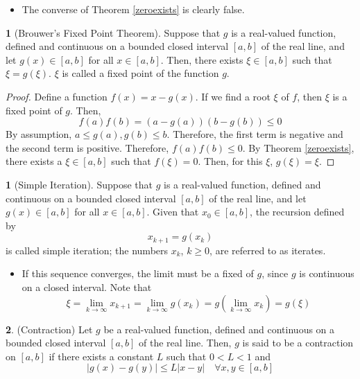 \documentclass[12pt]{article}
\theoremstyle{definition}
\newtheorem{definition}{\color{NavyBlue}{\textbf{Definition}}}
\newtheorem{theorem}{\color{ForestGreen}{\textbf{Theorem}}}
\theoremstyle{definition}
\begin{document}
\begin{itemize}
\item The converse of Theorem \ref{zeroexists} is clearly false.
\end{itemize}

\begin{theorem}[Brouwer's Fixed Point Theorem]
Suppose that $g$ is a real-valued function, defined and continuous on a bounded closed interval $[a,b]$ of the real line, and let $g(x) \in [a,b]$ for all $x \in [a,b]$. Then, there exists $\xi \in [a,b]$ such that $\xi = g(\xi)$. $\xi$ is called a fixed point of the function $g$. 
\end{theorem}
\begin{proof}
Define a function $f(x) = x - g(x)$. If we find a root $\xi$ of $f$, then $\xi$ is a fixed point of $g$. Then,
\begin{equation}
f(a)f(b) = (a - g(a))(b-g(b)) \leq 0
\end{equation}
By assumption, $a \leq g(a), g(b) \leq b$. Therefore, the first term is negative and the second term is positive. Therefore, $f(a)f(b) \leq 0$. By Theorem \ref{zeroexists}, there exists a $\xi \in [a,b]$ such that $f(\xi)=0$. Then, for this $\xi$, $g(\xi) = \xi$.
\end{proof}

\begin{definition}[Simple Iteration]
Suppose that $g$ is a real-valued function, defined and continuous on a bounded closed interval $[a,b]$ of the real line, and let $g(x) \in [a,b]$ for all $x \in [a,b]$. Given that $x_0 \in [a,b]$, the recursion defined by 
\begin{equation}
x_{k+1} = g(x_k)
\end{equation}
is called simple iteration; the numbers $x_k$, $k \geq 0$, are referred to as iterates.
\end{definition}

\begin{itemize}
\item If this sequence converges, the limit must be a fixed of $g$, since $g$ is continuous on a closed interval. Note that
\begin{equation}
\xi = \lim_{k \to \infty} x_{k+1} = \lim_{k \to \infty} g(x_k) = g\left( \lim_{k \to \infty} x_k \right) = g(\xi)
\end{equation}
\end{itemize}

\begin{definition}(Contraction)
Let $g$ be a real-valued function, defined and continuous on a bounded closed interval $[a,b]$ of the real line. Then, $g$ is said to be a contraction on $[a,b]$ if there exists a constant $L$ such that $0<L<1$ and 
\begin{equation}
|g(x)-g(y)| \leq L|x-y| \quad \forall x,y \in [a,b]
\end{equation}
\end{definition}
\end{document}

